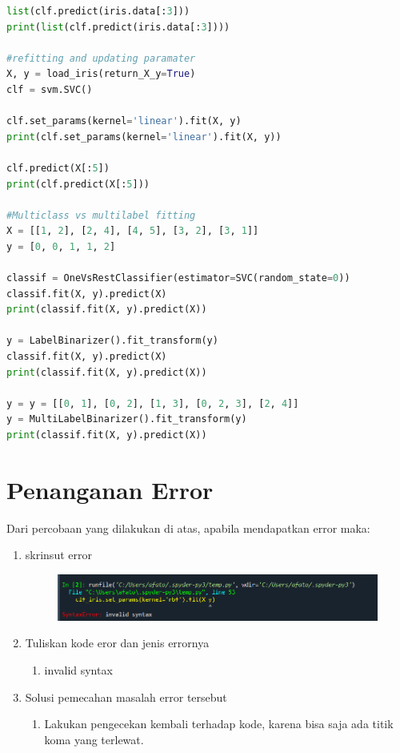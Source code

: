 \begin{enumerate}
\begin{lstlisting}[language=Python]
list(clf.predict(iris.data[:3]))
print(list(clf.predict(iris.data[:3])))

#refitting and updating paramater
X, y = load_iris(return_X_y=True)
clf = svm.SVC()

clf.set_params(kernel='linear').fit(X, y)
print(clf.set_params(kernel='linear').fit(X, y))

clf.predict(X[:5])
print(clf.predict(X[:5]))

#Multiclass vs multilabel fitting
X = [[1, 2], [2, 4], [4, 5], [3, 2], [3, 1]]
y = [0, 0, 1, 1, 2]

classif = OneVsRestClassifier(estimator=SVC(random_state=0))
classif.fit(X, y).predict(X)
print(classif.fit(X, y).predict(X))

y = LabelBinarizer().fit_transform(y)
classif.fit(X, y).predict(X)
print(classif.fit(X, y).predict(X))

y = y = [[0, 1], [0, 2], [1, 3], [0, 2, 3], [2, 4]]
y = MultiLabelBinarizer().fit_transform(y)
print(classif.fit(X, y).predict(X))
\end{lstlisting}
\end{enumerate}



\section{Penanganan Error}
Dari percobaan yang dilakukan di atas, apabila mendapatkan error maka:

\begin{enumerate}
	\item
	skrinsut error\
    \begin{figure}[!htbp]
        \centering
        \includegraphics[scale=0.5]{figures/6.png}
        \end{figure}

	\item
Tuliskan kode eror dan jenis errornya\
    \begin{enumerate}
        \item invalid syntax
    \end{enumerate}

	\item
Solusi pemecahan masalah error tersebut\
\begin{enumerate}
    \item Lakukan pengecekan kembali terhadap kode, karena bisa saja ada titik koma yang terlewat.
    \begin{figure}[!htbp]
        \centering
        \end{figure}
    
\end{enumerate}

\end{enumerate}

